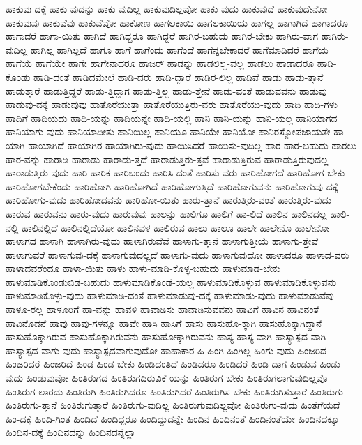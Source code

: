 {ಹಾಕುವು-ದಕ್ಕೆ
ಹಾಕು-ವುದನ್ನು
ಹಾಕು-ವುದಿಲ್ಲ
ಹಾಕುವುದಿಲ್ಲವೋ
ಹಾಕು-ವುದು
ಹಾಕುವುದೆ
ಹಾಕುವುದೇನೋ
ಹಾಕುವುವು
ಹಾಕುವೆವು
ಹಾಕುವೆವೋ
ಹಾಕೋಣ
ಹಾಗಲಕಾಯಿ
ಹಾಗಲಕಾಯಿಯ
ಹಾಗಲ್ಲ
ಹಾಗಾಗಿದೆ
ಹಾಗಾದರೂ
ಹಾಗಾದರೆ
ಹಾಗಾ-ಯಿತು
ಹಾಗಿದೆ
ಹಾಗಿದ್ದರೂ
ಹಾಗಿದ್ದರೆ
ಹಾಗಿರ-ಬಹುದು
ಹಾಗಿರ-ಬೇಕು
ಹಾಗಿರು-ವಾಗ
ಹಾಗಿರು-ವುದಿಲ್ಲ
ಹಾಗಿಲ್ಲ
ಹಾಗಿಲ್ಲದೆ
ಹಾಗೂ
ಹಾಗೆ
ಹಾಗೆಂದು
ಹಾಗೆಂದೆ
ಹಾಗೆನ್ನಬೇಕಾದರೆ
ಹಾಗೆಮಾಡಿದರೆ
ಹಾಗೆಯ
ಹಾಗೆಯೆ
ಹಾಗೆಯೇ
ಹಾಗೇ
ಹಾಗೇನಾದರೂ
ಹಾಜರ್
ಹಾಡನ್ನು
ಹಾಡಲಿಲ್ಲ-ವಲ್ಲ
ಹಾಡಲು
ಹಾಡಾದರೂ
ಹಾಡಿ-ಕೊಂಡು
ಹಾಡಿ-ದಂತೆ
ಹಾಡಿದಮೇಲೆ
ಹಾಡಿ-ದರು
ಹಾಡಿ-ದ್ದಾರೆ
ಹಾಡಿರ-ಲಿಲ್ಲ
ಹಾಡಿವೆ
ಹಾಡು
ಹಾಡು-ತ್ತಾನೆ
ಹಾಡುತ್ತಾರೆ
ಹಾಡುತ್ತಿದ್ದರೆ
ಹಾಡು-ತ್ತಿದ್ದಾಗ
ಹಾಡು-ತ್ತಿಲ್ಲ
ಹಾಡು-ತ್ತೇನೆ
ಹಾಡು-ವಂತೆ
ಹಾಡುವವನು
ಹಾಡುವು
ಹಾಡುವು-ದಕ್ಕೆ
ಹಾಡುವುವು
ಹಾತೊರೆಯುತ್ತಾ
ಹಾತೊರೆಯುತ್ತಿರು-ವರು
ಹಾತೊರೆಯು-ವುದು
ಹಾದಿ
ಹಾದಿ-ಗಳು
ಹಾದಿಗೆ
ಹಾದಿಯದು
ಹಾದಿ-ಯನ್ನು
ಹಾದಿಯನ್ನೇ
ಹಾದಿ-ಯಲ್ಲಿ
ಹಾನಿ
ಹಾನಿ-ಯನ್ನು
ಹಾನಿ-ಯಲ್ಲ
ಹಾನಿಯಾಗದ
ಹಾನಿಯಾಗು-ವುದು
ಹಾನಿಯಾದೀತು
ಹಾನಿಯಿಲ್ಲ
ಹಾನಿಯೂ
ಹಾನಿಯೇ
ಹಾನಿಯೋ
ಹಾನಿರಸ್ಯೋಪಜಾಯತೇ
ಹಾ-ಯಾಗಿ
ಹಾಯಾಗಿದೆ
ಹಾಯಾಗಿರ
ಹಾಯಾಗಿರು-ವುದು
ಹಾಯಿಸಿದರೆ
ಹಾಯಿಸು-ವುದಿಲ್ಲ
ಹಾರ
ಹಾರ-ಬಹುದು
ಹಾರಲು
ಹಾರ-ವನ್ನು
ಹಾರಾಡಿ
ಹಾರಾಡು
ಹಾರಾಡು-ತ್ತದೆ
ಹಾರಾಡುತ್ತಿರು-ತ್ತವೆ
ಹಾರಾಡುತ್ತಿರುವ
ಹಾರಾಡುತ್ತಿರುವುದಲ್ಲ
ಹಾರಾಡುತ್ತಿರು-ವುದು
ಹಾರಿ
ಹಾರಿಕ
ಹಾರಿಬಂದು
ಹಾರಿಸಿ-ದಂತೆ
ಹಾರಿಸು-ವರು
ಹಾರಿಹೋಗದೆ
ಹಾರಿಹೋಗ-ಬೇಕು
ಹಾರಿಹೋಗಬೇಕೆಂದು
ಹಾರಿಹೋಗಿ
ಹಾರಿಹೋಗಿದೆ
ಹಾರಿಹೋಗುತ್ತಿದೆ
ಹಾರಿಹೋಗುವನು
ಹಾರಿಹೋಗುವು-ದಕ್ಕೆ
ಹಾರಿಹೋಗು-ವುದು
ಹಾರಿಹೋದವನು
ಹಾರಿಹೋ-ಯಿತು
ಹಾರು-ತ್ತಾನೆ
ಹಾರುತ್ತಿರು-ವಂತೆ
ಹಾರುತ್ತಿರು-ವುದು
ಹಾರುವ
ಹಾರುವನು
ಹಾರು-ವುದು
ಹಾರುವುವು
ಹಾಲನ್ನು
ಹಾಲಿಗೂ
ಹಾಲಿಗೆ
ಹಾ-ಲಿದೆ
ಹಾಲಿನ
ಹಾಲಿನದಲ್ಲ
ಹಾಲಿ-ನಲ್ಲಿ
ಹಾಲಿನಲ್ಲಿದೆ
ಹಾಲಿನಲ್ಲಿದೆಯೋ
ಹಾಲಿನವಳ
ಹಾಲಿರುವ
ಹಾಲು
ಹಾಲೂ
ಹಾಲೇ
ಹಾಲೇನೊ
ಹಾಲೇನೋ
ಹಾಳಾಗದ
ಹಾಳಾಗಿ
ಹಾಳಾಗಿರು-ವುದು
ಹಾಳಾಗಿರುವೆವೆ
ಹಾಳಾಗು-ತ್ತಾನೆ
ಹಾಳಾಗುತ್ತೀಯೆ
ಹಾಳಾಗು-ತ್ತೇವೆ
ಹಾಳಾಗುವರೆ
ಹಾಳಾಗುವು-ದಕ್ಕೆ
ಹಾಳಾಗುವುದಲ್ಲದೆ
ಹಾಳಾಗು-ವುದು
ಹಾಳಾಗುವುದೋ
ಹಾಳಾದರೂ
ಹಾಳಾದ-ವರು
ಹಾಳಾದವರೆಂದೂ
ಹಾಳಾ-ಯಿತು
ಹಾಳು
ಹಾಳು-ಮಾಡಿ-ಕೊಳ್ಳ-ಬಹುದು
ಹಾಳುಮಾಡ-ಬೇಕು
ಹಾಳುಮಾಡಿಕೊಂಡುಬಿಡ-ಬಹುದು
ಹಾಳುಮಾಡಿಕೊಂಡೆ-ಯಲ್ಲ
ಹಾಳುಮಾಡಿಕೊಳ್ಳುವ
ಹಾಳುಮಾಡಿಕೊಳ್ಳುವನು
ಹಾಳುಮಾಡಿಕೊಳ್ಳು-ವುದು
ಹಾಳುಮಾಡಿ-ದಂತೆ
ಹಾಳುಮಾಡುವು-ದಕ್ಕೆ
ಹಾಳುಮಾಡು-ವುದು
ಹಾಳುಮಾಡುವೆವು
ಹಾಳೂ-ರಲ್ಲ
ಹಾಳೂರಿಗೆ
ಹಾ-ವನ್ನು
ಹಾವಳಿ
ಹಾವಾಡಿಸು
ಹಾವಾಡಿಸುವವನು
ಹಾವಿಗೆ
ಹಾವಿನ
ಹಾವಿನಂತೆ
ಹಾವಿನೊಡನೆ
ಹಾವು
ಹಾವು-ಗಳನ್ನೂ
ಹಾವೇ
ಹಾಸಿ
ಹಾಸಿಗೆ
ಹಾಸು
ಹಾಸುಹೊ-ಕ್ಕಾಗಿ
ಹಾಸುಹೊಕ್ಕಾಗಿದ್ದಾನೆ
ಹಾಸುಹೊಕ್ಕಾಗಿರುವ
ಹಾಸುಹೊಕ್ಕಾಗಿರುವನು
ಹಾಸುಹೋಕ್ಕಾಗಿರುವನು
ಹಾಸ್ಯ
ಹಾಸ್ಯ-ವಾಗಿ
ಹಾಸ್ಯಾಸ್ಪದ-ವಾಗಿ
ಹಾಸ್ಯಾಸ್ಪದ-ವಾಗು-ವುದು
ಹಾಸ್ಯಾಸ್ಪದವಾಗುವುದೋ
ಹಾಹಾಕಾರ
ಹಿ
ಹಿಂಗಿ
ಹಿಂಗಿಲ್ಲ
ಹಿಂಗು-ವುದು
ಹಿಂಜರಿದ
ಹಿಂಜರಿದರೆ
ಹಿಂಜರಿದೆ
ಹಿಂಡ
ಹಿಂಡ-ಬೇಕು
ಹಿಂಡಿದಂತಿದೆ
ಹಿಂಡಿದರೂ
ಹಿಂಡಿದರೆ
ಹಿಂಡಿ-ದಾಗ
ಹಿಂಡುವ
ಹಿಂಡು-ವುದು
ಹಿಂಡುವುವೋ
ಹಿಂತಿರುಗದ
ಹಿಂತಿರುಗದಿರುವಿಕೆ-ಯನ್ನು
ಹಿಂತಿರುಗ-ಬೇಕು
ಹಿಂತಿರುಗಲಾಗುವುದಿಲ್ಲವೊ
ಹಿಂತಿರುಗ-ಲಾರದು
ಹಿಂತಿರುಗಿ
ಹಿಂತಿರುಗಿದರೂ
ಹಿಂತಿರುಗಿದರೆ
ಹಿಂತಿರುಗಿಸ-ಬೇಕು
ಹಿಂತಿರುಗಿಸುತ್ತಾರೆ
ಹಿಂತಿರುಗು
ಹಿಂತಿರುಗು-ತ್ತಾನೆ
ಹಿಂತಿರುಗುತ್ತಾರೆ
ಹಿಂತಿರುಗು-ವುದಿಲ್ಲ
ಹಿಂತಿರುಗುವುದಿಲ್ಲವೋ
ಹಿಂತಿರುಗು-ವುದು
ಹಿಂತೆಗೆಯದೆ
ಹಿಂ-ದಕ್ಕೆ
ಹಿಂದಿ-ಗಿಂತ
ಹಿಂದಿದೆ
ಹಿಂದಿದ್ದರೂ
ಹಿಂದಿದ್ದುದನ್ನೇ
ಹಿಂದಿನ
ಹಿಂದಿನಂತೆ
ಹಿಂದಿನಂತೆಯೇ
ಹಿಂದಿನದಕ್ಕೂ
ಹಿಂದಿನ-ದಕ್ಕೆ
ಹಿಂದಿನದನ್ನು
ಹಿಂದಿನದನ್ನೆಲ್ಲಾ
}
